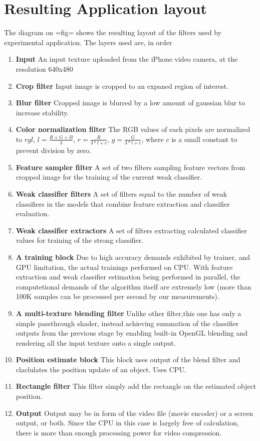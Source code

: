 \section{Resulting Application layout}
The diagram on {{=fig=}} shows the resulting layout of the filters used by experimental application. The layers used are, in order
\begin{enumerate}
\item {\bf Input} An input texture uploaded from the iPhone video camera, at the resolution 640x480
\item {\bf Crop filter} Input image is cropped to an expaned region of interest.
\item {\bf Blur filter} Cropped image is blurred by a low amount of gaussian blur to increase stability.
\item {\bf Color normalization filter} The RGB values of each pixels are normalized to $rgl$, $l=\frac{R+G+B}{3}$, $r=\frac{R}{3*l+c}$, $g=\frac{G}{3*l+c}$, where $c$ is a small constant to prevent division by zero.
\item {\bf Feature sampler filter} A set of two filters sampling feature vectors from cropped image for the training of the current weak classifier. 
\item {\bf Weak classifier filters} A set of filters equal to the number of weak classifiers in the models that combine feature extraction and classifier evaluation.
\item {\bf Weak classifier extractors} A set of filters extracting calculated classifier values for training of the strong classifier.
\item {\bf A training block} Due to high accuracy demands exhibited by trainer, and GPU limitation, the actual trainings performed on CPU. With feature extraction and weak classifier estimation being performed in parallel, the computetional demands of the algorithm itself are extremely low (more than 100K samples can be processed per second by our measurements). 
\item {\bf A multi-texture blending filter} Unlike other filter,this one has only a simple passthrough shader, instead achieving summation of the classifier outputs from the previous stage by  enabling built-in OpenGL blending and rendering all the input texture onto a single output. 
\item {\bf Position estimate block} This block uses output of the blend filter and claclulates the position update of an object. Uses CPU. 
\item {\bf Rectangle filter} This filter simply add the rectangle on the estimated object position. 
\item {\bf Output} Output may be in form of the video file (movie encoder) or a screen output, or both. Since the CPU in this case is largely free of calculation, there is more than enough processing power for video compression. 
\end{enumerate}

